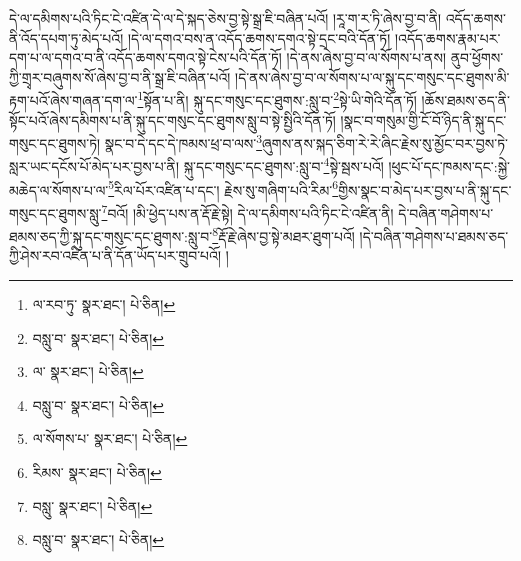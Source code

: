 དེ་ལ་དམིགས་པའི་ཏིང་ངེ་འཛིན་དེ་ལ་དེ་སྐད་ཅེས་བྱ་སྟེ་སྒྲ་ཇི་བཞིན་པའོ། །རཱ་ག་ར་ཏི་ཞེས་བྱ་བ་ནི། འདོད་ཆགས་ནི་འོད་དཔག་ཏུ་མེད་པའོ། །དེ་ལ་དགའ་བས་ན་འདོད་ཆགས་དགའ་སྟེ་དྲང་བའི་དོན་ཏོ། །འདོད་ཆགས་རྣམ་པར་དག་པ་ལ་དགའ་བ་ནི་འདོད་ཆགས་དགའ་སྟེ་ངེས་པའི་དོན་ཏོ། །དེ་ནས་ཞེས་བྱ་བ་ལ་སོགས་པ་ནས། ནུབ་ཕྱོགས་ཀྱི་གྲྭར་བཞུགས་སོ་ཞེས་བྱ་བ་ནི་སྒྲ་ཇི་བཞིན་པའོ། །དེ་ནས་ཞེས་བྱ་བ་ལ་སོགས་པ་ལ་སྐུ་དང་གསུང་དང་ཐུགས་མི་རྟག་པའོ་ཞེས་གཞན་དག་ལ་\footnote{ལ་རབ་ཏུ་  སྣར་ཐང་།  པེ་ཅིན། }སྟོན་པ་ནི། སྐུ་དང་གསུང་དང་ཐུགས་:སླུ་བ་\footnote{བསླུ་བ་  སྣར་ཐང་།  པེ་ཅིན། }སྟེ་ཡི་གེའི་དོན་ཏོ། །ཆོས་ཐམས་ཅད་ནི་སྟོང་པའོ་ཞེས་དམིགས་པ་ནི་སྐུ་དང་གསུང་དང་ཐུགས་སླུ་བ་སྟེ་སྤྱིའི་དོན་ཏོ། །སྣང་བ་གསུམ་གྱི་ངོ་བོ་ཉིད་ནི་སྐུ་དང་གསུང་དང་ཐུགས་ཏེ། སྣང་བ་དེ་དང་དེ་ཁམས་ཕྲ་བ་ལས་\footnote{ལ་  སྣར་ཐང་།  པེ་ཅིན། }ཞུགས་ནས་སྐད་ཅིག་རེ་རེ་ཞིང་རྗེས་སུ་མྱོང་བར་བྱས་ཏེ་སླར་ཡང་དངོས་པོ་མེད་པར་བྱས་པ་ནི། སྐུ་དང་གསུང་དང་ཐུགས་:སླུ་བ་\footnote{བསླུ་བ་  སྣར་ཐང་།  པེ་ཅིན། }སྟེ་སྦས་པའོ། །ཕུང་པོ་དང་ཁམས་དང་:སྐྱེ་མཆེད་ལ་སོགས་པ་ལ་\footnote{ལ་སོགས་པ་  སྣར་ཐང་།  པེ་ཅིན། }རིལ་པོར་འཛིན་པ་དང་། རྗེས་སུ་གཞིག་པའི་རིམ་\footnote{རིམས་  སྣར་ཐང་།  པེ་ཅིན། }གྱིས་སྣང་བ་མེད་པར་བྱས་པ་ནི་སྐུ་དང་གསུང་དང་ཐུགས་སླུ་\footnote{བསླུ་  སྣར་ཐང་།  པེ་ཅིན། }བའོ། །མི་ཕྱེད་པས་ན་རྡོ་རྗེ་སྟེ། དེ་ལ་དམིགས་པའི་ཏིང་ངེ་འཛིན་ནི། དེ་བཞིན་གཤེགས་པ་ཐམས་ཅད་ཀྱི་སྐུ་དང་གསུང་དང་ཐུགས་:སླུ་བ་\footnote{བསླུ་བ་  སྣར་ཐང་།  པེ་ཅིན། }རྡོ་རྗེ་ཞེས་བྱ་སྟེ་མཐར་ཐུག་པའོ། །དེ་བཞིན་གཤེགས་པ་ཐམས་ཅད་ཀྱི་ཤེས་རབ་འཛིན་པ་ནི་དོན་ཡོད་པར་གྲུབ་པའོ། །
